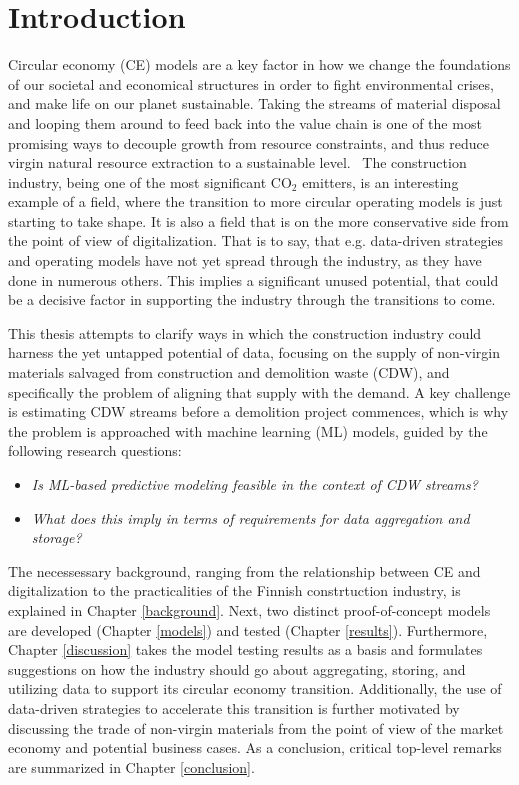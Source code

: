 \documentclass[english, 12pt, a4paper, sci, utf8, a-2b, online]{aaltothesis}
\begin{document}
\thispagestyle{empty}

\clearpage

\section{Introduction} \label{intro}

Circular economy (CE) models are a key factor in how we change the foundations of our societal and economical structures in order to fight environmental crises, and make life on our planet sustainable.
Taking the streams of material disposal and looping them around to feed back into the value chain is one of the most promising ways to decouple growth from resource constraints, and thus reduce
virgin natural resource extraction to a sustainable level.~\cite{wef} The construction industry, being one of the most significant $\text{CO}_2$ emitters, is an interesting example of a field, where
the transition to more circular operating models is just starting to take shape. It is also a field that is on the more conservative side from the point of view of digitalization.
That is to say, that e.g. data-driven strategies and operating models have not yet spread through the industry, as they have done in numerous others. This implies a significant unused potential,
that could be a decisive factor in supporting the industry through the transitions to come.

This thesis attempts to clarify ways in which the construction industry could harness the yet untapped potential of data, focusing on the supply of non-virgin materials salvaged from
construction and demolition waste (CDW), and specifically the problem of aligning that supply with the demand. A key challenge is estimating CDW streams before a demolition project commences, which
is why the problem is approached with machine learning (ML) models, guided by the following research questions:
%
\begin{itemize}
  \item \textit{Is ML-based predictive modeling feasible in the context of CDW streams?}
  \item \textit{What does this imply in terms of requirements for data aggregation and storage?}
\end{itemize}
%
The necessessary background, ranging from the relationship between CE and digitalization to the practicalities of the Finnish
constrtuction industry, is explained in Chapter \ref{background}. Next, two distinct proof-of-concept models are developed (Chapter \ref{models}) and tested (Chapter \ref{results}).
Furthermore, Chapter \ref{discussion} takes the model testing results as a basis and formulates suggestions on how the industry should go about aggregating, storing, and utilizing data to support
its circular economy transition. Additionally, the use of data-driven strategies to accelerate this transition is further motivated by discussing the trade of non-virgin materials from the point
of view of the market economy and potential business cases. As a conclusion, critical top-level remarks are summarized in Chapter \ref{conclusion}.
\end{document}
